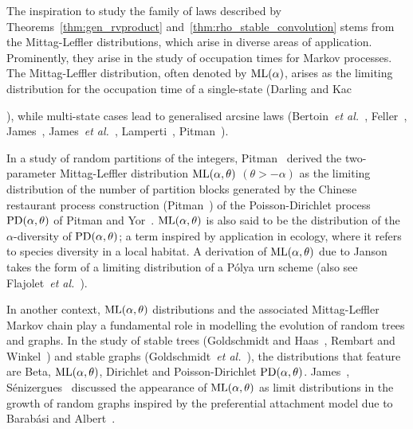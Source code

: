 \documentclass[a4paper,12pt]{article}
\begin{document}
The inspiration to study the family of laws described by Theorems~\ref{thm:gen_rvproduct}  and~\ref{thm:rho_stable_convolution}
stems from the   Mittag-Leffler 
distributions, which arise in diverse areas of application. %
Prominently, they arise  in the study of  occupation times for  Markov processes.
The   Mittag-Leffler distribution, often   denoted by ${\rm ML}(\alpha)$,   arises as 
the limiting distribution  for the occupation time of a single-state (Darling and Kac~{\cite{DarlingKac}),
while  multi-state cases lead to generalised arcsine laws
(Bertoin~{\it et al.}~\cite{Bertoin}, Feller~\cite[XIV.3]{Feller2}, James~\cite{James_Bernoulli, James_Lamperti}, 
James~{\it et al.}~\cite{JamesRoynetteYor},
Lamperti~\cite{Lamperti},  Pitman~\cite{Pitman_CSP, Pitman2018}).

In a study of  random partitions of the integers,
Pitman~\cite[Theorem~3.8]{Pitman_CSP}  derived the two-parameter Mittag-Leffler   distribution ${\rm ML(\alpha,\theta})$   $(\theta>-\alpha)$ %
as the limiting  distribution of the number of partition blocks generated by 
 the Chinese restaurant process construction (Pitman~\cite[3.1]{Pitman_CSP})  of   the
Poisson-Dirichlet process ${\rm PD(\alpha,\theta})$ of Pitman and Yor~\cite{PitmanYor}.
${\rm ML(\alpha,\theta})$ is also said to be the distribution of the $\alpha$-diversity of ${\rm PD(\alpha,\theta})$;
a term inspired by application in ecology, where it refers to species diversity in a local habitat.
A derivation of ${\rm ML(\alpha,\theta})$   due to Janson~\cite{Janson} takes  the form of  a limiting distribution of  a  P{\' o}lya urn scheme
(also see Flajolet~{\it  et al.}~\cite{Flajolet}).

In another  context, ${\rm ML(\alpha,\theta})$ distributions  and the associated Mittag-Leffler Markov chain
play a fundamental role in  modelling  the evolution of  random trees and graphs. 
In the study of stable trees (Goldschmidt and Haas~\cite{GoldschmidtHaas}, Rembart and Winkel~\cite{RembartWinkel2018, RembartWinkel2023})
and stable graphs (Goldschmidt~{\it  et al.}~\cite{ Goldschmidt22}), 
the distributions that feature  are Beta, ${\rm ML(\alpha,\theta})$, 
Dirichlet and Poisson-Dirichlet  ${\rm PD(\alpha,\theta})$.
James~\cite{James2015}, S\'{e}nizergues~\cite{Senizergues} discussed the appearance of  
${\rm ML(\alpha,\theta})$ as limit distributions  in the   growth of random graphs
 inspired by  the preferential  attachment model due to Barab\'{a}si and  Albert~\cite{BarabasiAlbert}.
 
}
\end{document}
